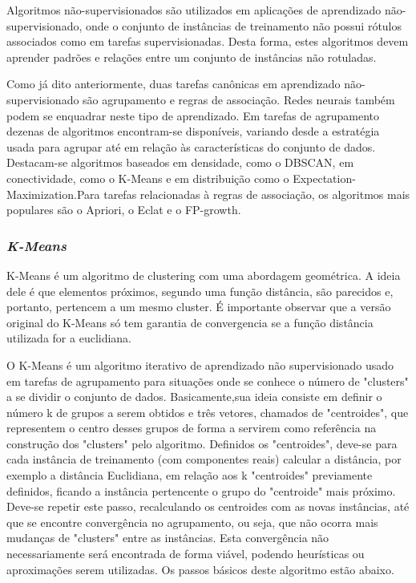 \documentclass{article}
\begin{document}
Algoritmos não-supervisionados são utilizados em aplicações de aprendizado não-supervisionado, onde o conjunto de instâncias de treinamento não possui rótulos associados como em tarefas supervisionadas. Desta forma, estes algoritmos devem aprender padrões e relações entre um conjunto de instâncias não rotuladas.

Como já dito anteriormente, duas tarefas canônicas em aprendizado não-supervisionado são agrupamento e regras de associação. Redes neurais também podem se enquadrar neste tipo de aprendizado. Em tarefas de agrupamento dezenas de algoritmos encontram-se disponíveis, variando desde a estratégia usada para agrupar até em relação às características do conjunto de dados. Destacam-se algoritmos baseados em densidade, como o DBSCAN, em conectividade, como o K-Means e em distribuição como o Expectation-Maximization.Para tarefas relacionadas à regras de associação, os algoritmos mais populares são o Apriori, o Eclat e o FP-growth.  

\subsubsection{{\b \it K-Means}}
K-Means é um algoritmo de clustering com uma abordagem geométrica.
A ideia dele é que elementos próximos, segundo uma função distância, são parecidos e, portanto, pertencem a um mesmo cluster.
É importante observar que a versão original do K-Means só tem garantia de convergencia se a função distância utilizada for a euclidiana.



O K-Means é um algoritmo iterativo de aprendizado não supervisionado usado em tarefas de agrupamento para situações onde se conhece o número de "clusters" a se dividir o conjunto de dados. Basicamente,sua ideia consiste em definir o número k de grupos a serem obtidos e três vetores, chamados de "centroides", que representem o centro desses grupos de forma a servirem como referência na construção dos "clusters" pelo algoritmo. Definidos os "centroides", deve-se para cada instância de treinamento (com componentes reais) calcular a distância, por exemplo a distância Euclidiana, em relação aos k "centroides" previamente definidos, ficando a instância pertencente o grupo do "centroide" mais próximo. Deve-se repetir este passo, recalculando os centroides com as novas instâncias, até que se encontre convergência no agrupamento, ou seja, que não ocorra mais mudanças de "clusters" entre as instâncias. Esta convergência não necessariamente será encontrada de forma viável, podendo heurísticas ou aproximações serem utilizadas. Os passos básicos deste algoritmo estão abaixo.
\end{document}
